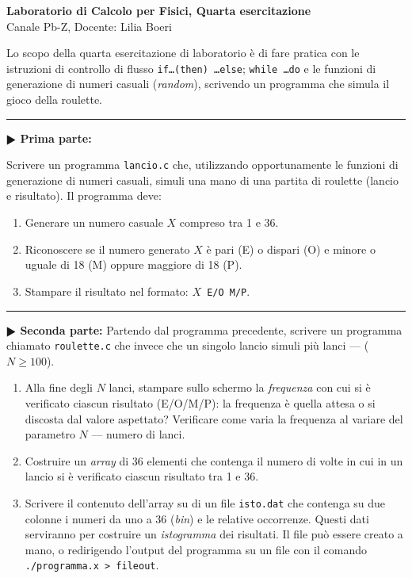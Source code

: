 \documentclass[11pt]{article}
\begin{document}
\pagestyle{empty}

\begin{center}
{\Large \bf  Laboratorio di Calcolo per Fisici, Quarta esercitazione\\[2mm]}
{\large Canale Pb-Z, Docente: Lilia Boeri}
\end{center}
\vspace{4mm}

\begin{mdframed}[backgroundcolor=panna]
  Lo scopo della quarta esercitazione di laboratorio \`e di fare pratica con
  le istruzioni di controllo di flusso \texttt{if\ldots (then) \ldots else}; \texttt{while \ldots do} e le funzioni di generazione di numeri casuali ({\em random\/}), scrivendo un programma che simula il gioco della roulette.
  \end{mdframed}
%
%



\hrule
\vspace{2mm}
\textbf{$\RHD$ Prima parte:}

Scrivere un programma \texttt{lancio.c} che, utilizzando opportunamente le
funzioni di generazione di numeri casuali, simuli una mano di una partita di
roulette (lancio e risultato). Il programma deve:
\begin{enumerate}
\item Generare un numero casuale $X$ compreso tra 1 e 36.
\item Riconoscere se il numero generato $X$ \`e pari (E) o dispari (O) e minore
o uguale di 18 (M) oppure maggiore di 18 (P).
\item Stampare il risultato nel formato: \texttt{$X$ E/O M/P}.
\end{enumerate}

\hrule
\vspace{2mm}
\textbf{$\RHD$ Seconda parte:}
Partendo dal programma precedente, scrivere un programma chiamato \texttt{roulette.c} che
invece che un singolo lancio simuli pi\`u lanci ---  ($N \ge 100$).
\begin{enumerate}
\item Alla fine degli $N$ lanci, stampare sullo schermo la {\em frequenza\/}
con cui si \`e verificato ciascun risultato (E/O/M/P): la frequenza
\`e quella attesa o si discosta dal valore aspettato? Verificare come
varia la frequenza al variare del parametro $N$ --- numero di lanci.
\item Costruire un {\em array\/} di 36 elementi che contenga il numero di
volte in cui  in un lancio  si \`e verificato ciascun risultato tra 1 e 36.
\item Scrivere il contenuto dell'array su di un file
  \texttt{isto.dat} che contenga
su due colonne i numeri da uno a 36 ({\em bin\/}) e le relative occorrenze.
Questi dati serviranno per costruire un {\em istogramma\/} dei risultati.
Il file pu\`o essere creato a mano, o redirigendo l'output del programma
su un file con il comando \texttt{./programma.x > fileout}.
\end{enumerate}
\end{document}
